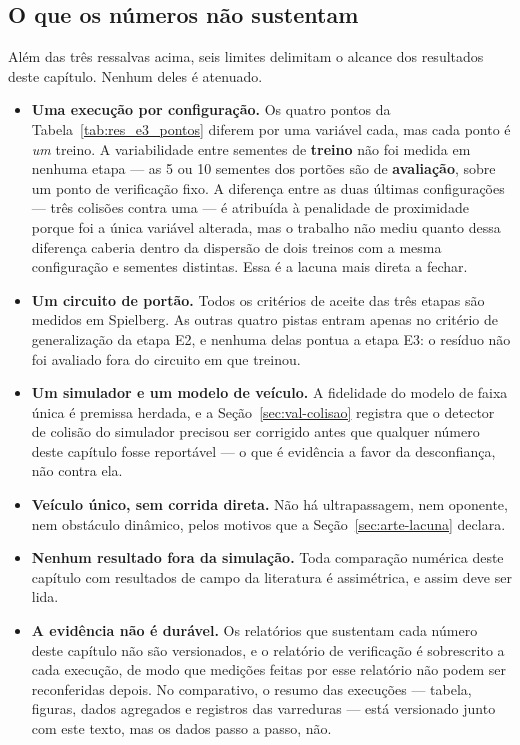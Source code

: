 \subsection{O que os números não sustentam}

Além das três ressalvas acima, seis limites delimitam o alcance dos resultados
deste capítulo. Nenhum deles é atenuado.

\begin{itemize}
    \item \textbf{Uma execução por configuração.} Os quatro pontos da
          Tabela~\ref{tab:res_e3_pontos} diferem por uma variável cada, mas cada
          ponto é \textit{um} treino. A variabilidade entre sementes de
          \textbf{treino} não foi medida em nenhuma etapa --- as 5 ou 10
          sementes dos portões são de \textbf{avaliação}, sobre um ponto de
          verificação fixo. A diferença entre as duas últimas configurações ---
          três colisões contra uma --- é atribuída à penalidade de proximidade
          porque foi a única variável alterada, mas o trabalho não mediu quanto
          dessa diferença caberia dentro da dispersão de dois treinos com a
          mesma configuração e sementes distintas. Essa é a lacuna mais direta a
          fechar.
    \item \textbf{Um circuito de portão.} Todos os critérios de aceite das três
          etapas são medidos em Spielberg. As outras quatro pistas entram apenas
          no critério de generalização da etapa E2, e nenhuma delas pontua a
          etapa E3: o resíduo não foi avaliado fora do circuito em que treinou.
    \item \textbf{Um simulador e um modelo de veículo.} A fidelidade do modelo
          de faixa única é premissa herdada, e a Seção~\ref{sec:val-colisao}
          registra que o detector de colisão do simulador precisou ser corrigido
          antes que qualquer número deste capítulo fosse reportável --- o que é
          evidência a favor da desconfiança, não contra ela.
    \item \textbf{Veículo único, sem corrida direta.} Não há ultrapassagem, nem
          oponente, nem obstáculo dinâmico, pelos motivos que a
          Seção~\ref{sec:arte-lacuna} declara.
    \item \textbf{Nenhum resultado fora da simulação.} Toda comparação
          numérica deste capítulo com resultados de campo da literatura é
          assimétrica, e assim deve ser lida.
    \item \textbf{A evidência não é durável.} Os relatórios que sustentam cada
          número deste capítulo não são versionados, e o relatório de
          verificação é sobrescrito a cada execução, de modo que medições
          feitas por esse relatório não podem ser reconferidas depois. No
          comparativo, o resumo das execuções --- tabela, figuras, dados
          agregados e registros das varreduras --- está versionado junto com
          este texto, mas os dados passo a passo, não.
\end{itemize}

